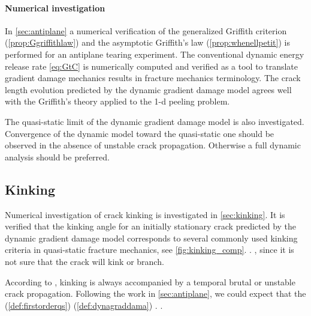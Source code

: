 \paragraph{Numerical investigation} In \cref{sec:antiplane} a numerical verification of the generalized Griffith criterion (\cref{prop:Ggriffithlaw}) and the asymptotic Griffith's law (\cref{prop:whenellpetit}) is performed for an antiplane tearing experiment. The conventional dynamic energy release rate \eqref{eq:GtC} is numerically computed and verified as a tool to translate gradient damage mechanics results in fracture mechanics terminology. The crack length evolution predicted by the dynamic gradient damage model agrees well with the Griffith's theory applied to the 1-d peeling problem.

The quasi-static limit of the dynamic gradient damage model is also investigated. Convergence of the dynamic model toward the quasi-static one should be observed in the absence of unstable crack propagation. Otherwise a full dynamic analysis should be preferred.

\subsection{Kinking}
Numerical investigation of crack kinking is investigated in \cref{sec:kinking}. It is verified that the kinking angle for an initially stationary crack predicted by the dynamic gradient damage model corresponds to several commonly used kinking criteria in quasi-static fracture mechanics, see \cref{fig:kinking_comp}. . , since it is not sure that the crack will kink or branch.

According to \cite{ChambolleFrancfortMarigo:2009}, kinking is always accompanied by a temporal brutal or unstable crack propagation. Following the work in \cref{sec:antiplane}, we could expect that the  (\cref{def:firstorderqs})  (\cref{def:dynagraddama}) . .

